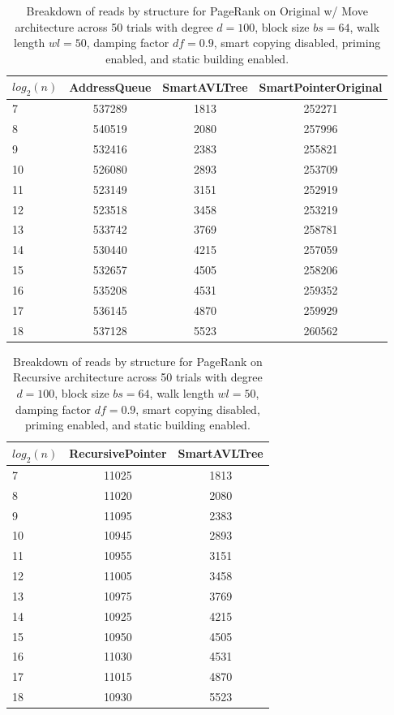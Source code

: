 \begin{table}[]
\centering
\begin{tabular}{|l|c|c|c|}
$log_2(n)$ & AddressQueue & SmartAVLTree & SmartPointerOriginal \\ \hline
7 & 537289 & 1813 & 252271 \\ \hline
8 & 540519 & 2080 & 257996 \\ \hline
9 & 532416 & 2383 & 255821 \\ \hline
10 & 526080 & 2893 & 253709 \\ \hline
11 & 523149 & 3151 & 252919 \\ \hline
12 & 523518 & 3458 & 253219 \\ \hline
13 & 533742 & 3769 & 258781 \\ \hline
14 & 530440 & 4215 & 257059 \\ \hline
15 & 532657 & 4505 & 258206 \\ \hline
16 & 535208 & 4531 & 259352 \\ \hline
17 & 536145 & 4870 & 259929 \\ \hline
18 & 537128 & 5523 & 260562 \\ \hline
\end{tabular}
\caption{Breakdown of reads by structure for PageRank on Original w/ Move architecture across 50 trials with degree $d=100$, block size $bs=64$, walk length $wl=50$, damping factor $df=0.9$, smart copying disabled, priming enabled, and static building enabled.}
    \label{tab:reads_by_structure_pr_d100_bs64_trials50_copiesfalse_primetrue_staticinsertiontrue_wl50_df0.9_ptoriginal_movetrue}
\end{table}

\begin{table}[]
\centering
\begin{tabular}{|l|c|c|}
$log_2(n)$ & RecursivePointer & SmartAVLTree \\ \hline
7 & 11025 & 1813 \\ \hline
8 & 11020 & 2080 \\ \hline
9 & 11095 & 2383 \\ \hline
10 & 10945 & 2893 \\ \hline
11 & 10955 & 3151 \\ \hline
12 & 11005 & 3458 \\ \hline
13 & 10975 & 3769 \\ \hline
14 & 10925 & 4215 \\ \hline
15 & 10950 & 4505 \\ \hline
16 & 11030 & 4531 \\ \hline
17 & 11015 & 4870 \\ \hline
18 & 10930 & 5523 \\ \hline
\end{tabular}
\caption{Breakdown of reads by structure for PageRank on Recursive architecture across 50 trials with degree $d=100$, block size $bs=64$, walk length $wl=50$, damping factor $df=0.9$, smart copying disabled, priming enabled, and static building enabled.}
    \label{tab:reads_by_structure_pr_d100_bs64_trials50_copiesfalse_primetrue_staticinsertiontrue_wl50_df0.9_ptrecursive_movetrue}
\end{table}

